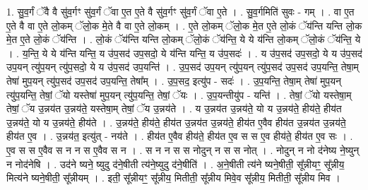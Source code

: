 \documentclass[17pt]{extarticle}
\begin{document}
1. सु॒व॒र्गं ॅवै वै सु॑व॒र्गꣳ सु॑व॒र्गं ॅवा ए॒त ए॒ते वै सु॑व॒र्गꣳ सु॑व॒र्गं ॅवा ए॒ते । . सु॒व॒र्गमिति॑ सुवः - गम् । . वा ए॒त ए॒ते वै वा ए॒ते लो॒कम् ॅलो॒क मे॒ते वै वा ए॒ते लो॒कम् । . ए॒ते लो॒कम् ॅलो॒क मे॒त ए॒ते लो॒कं ॅय॑न्ति यन्ति लो॒क मे॒त ए॒ते लो॒कं ॅय॑न्ति । . लो॒कं ॅय॑न्ति यन्ति लो॒कम् ॅलो॒कं ॅय॑न्ति॒ ये ये य॑न्ति लो॒कम् ॅलो॒कं ॅय॑न्ति॒ ये । . य॒न्ति॒ ये ये य॑न्ति यन्ति॒ य उ॑प॒सद॑ उप॒सदो॒ ये य॑न्ति यन्ति॒ य उ॑प॒सदः॑ । . य उ॑प॒सद॑ उप॒सदो॒ ये य उ॑प॒सद॑ उप॒यन् त्यु॑प॒यन् त्यु॑प॒सदो॒ ये य उ॑प॒सद॑ उप॒यन्ति॑ । . उ॒प॒सद॑ उप॒यन् त्यु॑प॒यन् त्यु॑प॒सद॑ उप॒सद॑ उप॒यन्ति॒ तेषा॒म् तेषा॑ मुप॒यन् त्यु॑प॒सद॑ उप॒सद॑ उप॒यन्ति॒ तेषा᳚म् । . उ॒प॒सद॒ इत्यु॑प - सदः॑ । . उ॒प॒यन्ति॒ तेषा॒म् तेषा॑ मुप॒यन् त्यु॑प॒यन्ति॒ तेषां॒ ॅयो यस्तेषा॑ मुप॒यन् त्यु॑प॒यन्ति॒ तेषां॒ ॅयः । . उ॒प॒यन्तीयु॑प - यन्ति॑ । . तेषां॒ ॅयो यस्तेषा॒म् तेषां॒ ॅय उ॒न्नय॑त उ॒न्नय॑ते॒ यस्तेषा॒म् तेषां॒ ॅय उ॒न्नय॑ते । . य उ॒न्नय॑त उ॒न्नय॑ते॒ यो य उ॒न्नय॑ते॒ हीय॑ते॒ हीय॑त उ॒न्नय॑ते॒ यो य उ॒न्नय॑ते॒ हीय॑ते । . उ॒न्नय॑ते॒ हीय॑ते॒ हीय॑त उ॒न्नय॑त उ॒न्नय॑ते॒ हीय॑त ए॒वैव हीय॑त उ॒न्नय॑त उ॒न्नय॑ते॒ हीय॑त ए॒व । . उ॒न्नय॑त॒ इत्यु॑त् - नय॑ते । . हीय॑त ए॒वैव हीय॑ते॒ हीय॑त ए॒व स स ए॒व हीय॑ते॒ हीय॑त ए॒व सः । . ए॒व स स ए॒वैव स न न स ए॒वैव स न । . स न न स स नोदुन् न स स नोत् । . नोदुन् न नो द॑नेष्य ने॒ष्युन् न नोद॑नेषि । . उद॑ने ष्यने॒ ष्युदु द॑ने॒षीती त्य॑ने॒ष्युदु द॑ने॒षीति॑ । . अ॒ने॒षीती त्य॑ने ष्यने॒षीती॒ सू᳚न्नीयꣳ॒॒ सू᳚न्नीय॒ मित्य॑ने ष्यने॒षीती॒ सू᳚न्नीयम् । . इती॒ सू᳚न्नीयꣳ॒॒ सू᳚न्नीय॒ मितीती॒ सू᳚न्नीय मिवे॒व सू᳚न्नीय॒ मितीती॒ सू᳚न्नीय मिव । \newline
\end{document}
